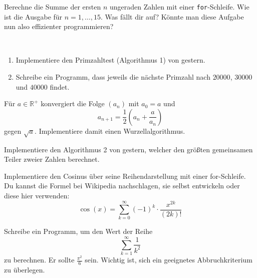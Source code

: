 \documentclass{uebungszettel}
\begin{document}
\newcommand{\ah}[2]{\ \\* \emph{(#1, #2)}\\}


\begin{aufg}
Berechne die Summe der ersten $n$ ungeraden Zahlen mit einer \texttt{for}-Schleife. Wie ist die Ausgabe für $n = 1, \ldots ,15$. Was fällt dir auf? Könnte man diese Aufgabe nun also effizienter programmieren?
\end{aufg}

\begin{aufg}~
\begin{enumerate}
\item Implementiere den Primzahltest (Algorithmus 1) von gestern.
\item Schreibe ein Programm, dass jeweils die nächste Primzahl nach $20000$, $30000$ und $40000$ findet.
\end{enumerate}
\end{aufg}

\begin{aufg}
Für $a \in \mathbb{R}^+$ konvergiert die Folge $(a_n)$ mit $a_0 = a$ und
\[ a_{n+1} = \frac{1}{2}\left(a_n + \frac{a}{a_n}\right) \]
gegen $\sqrt{a}$. Implementiere damit einen Wurzellalgorithmus.
\end{aufg}

\begin{aufg}
Implementiere den Algorithmus 2 von gestern, welcher den größten gemeinsamen Teiler zweier Zahlen berechnet.
\end{aufg}

\begin{aufg}
Implementiere den Cosinus über seine Reihendarstellung mit einer for-Schleife. Du kannst die Formel bei Wikipedia nachschlagen, sie selbst entwickeln oder diese hier verwenden:
\[ \cos(x) = \sum_{k = 0}^{\infty}{(-1)^k \cdot \frac{x^{2k}}{(2k)!}} \]
\end{aufg}

\begin{aufg}
Schreibe ein Programm, um den Wert der Reihe
\[ \sum_{k = 1}^\infty \frac{1}{k^2} \]
zu berechnen. Er sollte $\frac{\pi^2}{6}$ sein. Wichtig ist, sich ein geeignetes Abbruchkriterium zu überlegen.
\end{aufg}
\end{document}
